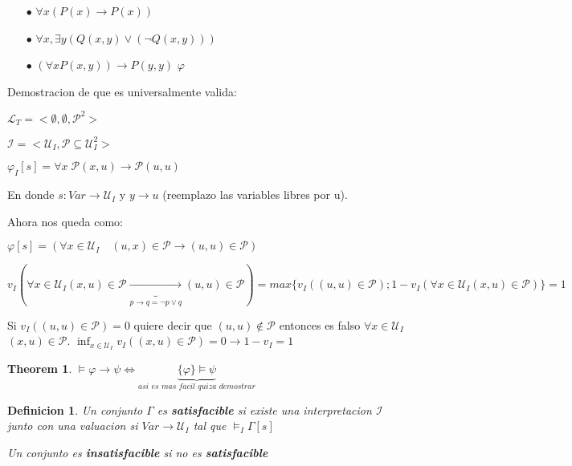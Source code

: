 \documentclass{amsart}
\newtheorem{theorem}{Theorem}
\newtheorem{definition}{Definicion}
\begin{document}
\begin{example}

\begin{enumerate}
	\item[$\bullet$] $\forall x (P(x) \rightarrow P(x))$
	\item[$\bullet$] $\forall x, \exists y (Q(x, y) \lor (\neg Q(x, y)))$
	\item[$\bullet$] $(\forall x P(x, y)) \rightarrow P(y, y)$ $\varphi$
\end{enumerate}

Demostracion de que es universalmente valida: 

$\mathcal{L}_{T} = <\emptyset, \emptyset, \mathcal{P}^{2}>$

$\mathcal{I} = <\mathcal{U}_{I}, \mathcal{P} \subseteq \mathcal{U}_{I}^{2}>$

$\varphi_{I}[s] = \forall x \; \mathcal{P}(x, u) \rightarrow \mathcal{P}(u, u)$

En donde $s \colon Var \rightarrow \mathcal{U}_{I}$ y $y \rightarrow u$ (reemplazo las variables libres por u).

Ahora nos queda como:

$\varphi[s] = (\forall x \in \mathcal{U}_{I} \quad (u, x) \in \mathcal{P} \rightarrow (u, u) \in \mathcal{P})$

$v_{I}(\forall x \in \mathcal{U}_{I} (x, u) \in \mathcal{P} \underbrace{\rightarrow}_{p \rightarrow q = \neg p \lor q} (u, u) \in \mathcal{P}) = max\{ v_{I}((u, u) \in \mathcal{P}); 1 - v_{I}(\forall x \in \mathcal{U}_{I}(x, u) \in \mathcal{P}) \} = 1$

Si $v_{I}((u, u) \in \mathcal{P}) = 0$ quiere decir que $(u, u) \notin \mathcal{P}$ entonces es falso $\forall x \in \mathcal{U}_{I}$ $(x, u) \in \mathcal{P}$. $\inf_{x \in \mathcal{U}_{I}} v_{I}((x, u) \in \mathcal{P}) = 0 \rightarrow 1 - v_{I} = 1$


\end{example}

\begin{theorem}
$\models \varphi \rightarrow \psi \iff \underbrace{\{ \varphi \} \models \psi}_{\textit{asi es mas facil quiza demostrar}}$ 
\end{theorem}

\begin{definition}
Un conjunto $\Gamma$ es \textbf{satisfacible} si existe una interpretacion $\mathcal{I}$ junto con una valuacion si $Var \rightarrow \mathcal{U}_{I}$ tal que $\models_{I} \Gamma[s]$

Un  conjunto es \textbf{insatisfacible} si no es \textbf{satisfacible}
\end{definition}
\end{document}
